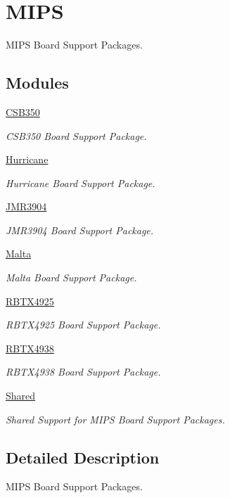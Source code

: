 \hypertarget{group__RTEMSBSPsMIPS}{}\section{M\+I\+PS}
\label{group__RTEMSBSPsMIPS}


M\+I\+PS Board Support Packages.  


\subsection*{Modules}
\begin{DoxyCompactItemize}
\item 
\mbox{\hyperlink{group__RTEMSBSPsMIPSCSB350}{C\+S\+B350}}
\begin{DoxyCompactList}\small\item\em C\+S\+B350 Board Support Package. \end{DoxyCompactList}\item 
\mbox{\hyperlink{group__RTEMSBSPsMIPSHurricane}{Hurricane}}
\begin{DoxyCompactList}\small\item\em Hurricane Board Support Package. \end{DoxyCompactList}\item 
\mbox{\hyperlink{group__RTEMSBSPsMIPSJMR3904}{J\+M\+R3904}}
\begin{DoxyCompactList}\small\item\em J\+M\+R3904 Board Support Package. \end{DoxyCompactList}\item 
\mbox{\hyperlink{group__RTEMSBSPsMIPSMalta}{Malta}}
\begin{DoxyCompactList}\small\item\em Malta Board Support Package. \end{DoxyCompactList}\item 
\mbox{\hyperlink{group__RTEMSBSPsMIPSRBTX4925}{R\+B\+T\+X4925}}
\begin{DoxyCompactList}\small\item\em R\+B\+T\+X4925 Board Support Package. \end{DoxyCompactList}\item 
\mbox{\hyperlink{group__RTEMSBSPsMIPSRBTX4938}{R\+B\+T\+X4938}}
\begin{DoxyCompactList}\small\item\em R\+B\+T\+X4938 Board Support Package. \end{DoxyCompactList}\item 
\mbox{\hyperlink{group__RTEMSBSPsMIPSShared}{Shared}}
\begin{DoxyCompactList}\small\item\em Shared Support for M\+I\+PS Board Support Packages. \end{DoxyCompactList}\end{DoxyCompactItemize}


\subsection{Detailed Description}
M\+I\+PS Board Support Packages. 

